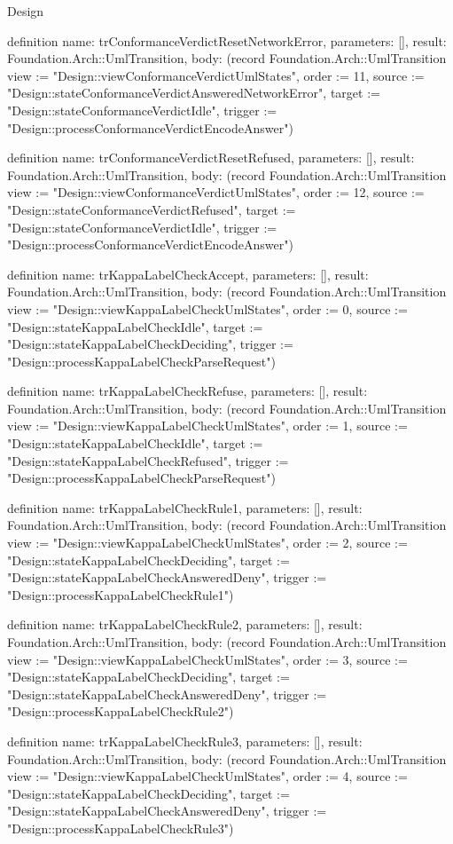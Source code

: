 \begin{lexlean}{Design}
\begin{semanticmodule}
definition{
  name: trConformanceVerdictResetNetworkError,
  parameters: [],
  result: Foundation.Arch::UmlTransition,
  body: (record Foundation.Arch::UmlTransition {view := "Design::viewConformanceVerdictUmlStates", order := 11, source := "Design::stateConformanceVerdictAnsweredNetworkError", target := "Design::stateConformanceVerdictIdle", trigger := "Design::processConformanceVerdictEncodeAnswer"})
}

definition{
  name: trConformanceVerdictResetRefused,
  parameters: [],
  result: Foundation.Arch::UmlTransition,
  body: (record Foundation.Arch::UmlTransition {view := "Design::viewConformanceVerdictUmlStates", order := 12, source := "Design::stateConformanceVerdictRefused", target := "Design::stateConformanceVerdictIdle", trigger := "Design::processConformanceVerdictEncodeAnswer"})
}

definition{
  name: trKappaLabelCheckAccept,
  parameters: [],
  result: Foundation.Arch::UmlTransition,
  body: (record Foundation.Arch::UmlTransition {view := "Design::viewKappaLabelCheckUmlStates", order := 0, source := "Design::stateKappaLabelCheckIdle", target := "Design::stateKappaLabelCheckDeciding", trigger := "Design::processKappaLabelCheckParseRequest"})
}

definition{
  name: trKappaLabelCheckRefuse,
  parameters: [],
  result: Foundation.Arch::UmlTransition,
  body: (record Foundation.Arch::UmlTransition {view := "Design::viewKappaLabelCheckUmlStates", order := 1, source := "Design::stateKappaLabelCheckIdle", target := "Design::stateKappaLabelCheckRefused", trigger := "Design::processKappaLabelCheckParseRequest"})
}

definition{
  name: trKappaLabelCheckRule1,
  parameters: [],
  result: Foundation.Arch::UmlTransition,
  body: (record Foundation.Arch::UmlTransition {view := "Design::viewKappaLabelCheckUmlStates", order := 2, source := "Design::stateKappaLabelCheckDeciding", target := "Design::stateKappaLabelCheckAnsweredDeny", trigger := "Design::processKappaLabelCheckRule1"})
}

definition{
  name: trKappaLabelCheckRule2,
  parameters: [],
  result: Foundation.Arch::UmlTransition,
  body: (record Foundation.Arch::UmlTransition {view := "Design::viewKappaLabelCheckUmlStates", order := 3, source := "Design::stateKappaLabelCheckDeciding", target := "Design::stateKappaLabelCheckAnsweredDeny", trigger := "Design::processKappaLabelCheckRule2"})
}

definition{
  name: trKappaLabelCheckRule3,
  parameters: [],
  result: Foundation.Arch::UmlTransition,
  body: (record Foundation.Arch::UmlTransition {view := "Design::viewKappaLabelCheckUmlStates", order := 4, source := "Design::stateKappaLabelCheckDeciding", target := "Design::stateKappaLabelCheckAnsweredDeny", trigger := "Design::processKappaLabelCheckRule3"})
}


\end{semanticmodule}
\end{lexlean}
